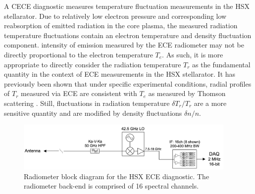 \documentclass[%
 aip,
 amsmath,amssymb,
 reprint,%
]{revtex4-1}
\begin{document}


A CECE diagnostic measures temperature fluctuation measurements in the HSX stellarator.  Due to relatively low electron pressure and corresponding low reabsorption of emitted radiation in the core plasma, the measured radiation temperature fluctuations contain an electron temperature and density fluctuation component. intensity of emission measured by the ECE radiometer may not be directly proportional to the electron temperature $T_e$. As such, it is more appropriate to directly consider the radiation temperature $T_r$ as the fundamental quantity in the context of ECE measurements in the HSX stellarator. It has previously been shown that under specific experimental conditions, radial profiles of $T_r$ measured via ECE are consistent with $T_e$ as measured by Thomson scattering \cite{weir-thesis}. Still, fluctuations in radiation temperature $\delta T_r/T_r$ are a more sensitive quantity and are modified by density fluctuations $\delta n/n$. 



\begin{figure}[!htbp]
\centering
\includegraphics[width=0.95\textwidth]{Figures/hsx_cece.png}
\caption{Radiometer block diagram for the HSX ECE diagnostic. The radiometer back-end is comprised of 16 spectral channels. }
\label{fig:radiometer}
\end{figure}
\end{document}
